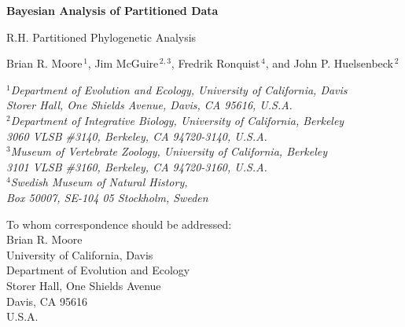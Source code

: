 \documentclass[11pt]{article}
\begin{document}


\begin{titlepage}
\begin{center}

{\Large\bf Bayesian Analysis of Partitioned Data}

\vfill

R.H. Partitioned Phylogenetic Analysis

\vfill

{\sc Brian R. Moore$^{\,1}$, Jim McGuire$^{\,2,3}$, Fredrik Ronquist$^{\,4}$, and John P. Huelsenbeck$^{\,2}$} \\

\bigskip

{\em
$\mbox{}^1$Department of Evolution and Ecology, University of California, Davis\\
\vspace{-0.4\baselineskip}
Storer Hall, One Shields Avenue, Davis, CA 95616, \mbox{U.S.A.} \\

$\mbox{}^2$Department of Integrative Biology, University of California, Berkeley\\
\vspace{-0.4\baselineskip}
3060 VLSB \#3140, Berkeley, CA 94720-3140, \mbox{U.S.A.} \\

$\mbox{}^3$Museum of Vertebrate Zoology, University of California, Berkeley\\
\vspace{-0.4\baselineskip}
3101 VLSB \#3160, Berkeley, CA 94720-3160, \mbox{U.S.A.} \\

$\mbox{}^4$Swedish Museum of Natural History,\\
\vspace{-0.4\baselineskip}
Box 50007, SE-104 05 Stockholm, Sweden \\
}
\end{center}




\vfill

\begin{flushleft}
To whom correspondence should be addressed: \\
Brian R. Moore \\
\vspace{-0.4\baselineskip}
University of California, Davis \\ 
\vspace{-0.4\baselineskip}
Department of Evolution and Ecology \\
\vspace{-0.4\baselineskip}
Storer Hall, One Shields Avenue \\
\vspace{-0.4\baselineskip}
Davis, CA 95616 \\
\vspace{-0.4\baselineskip}
\mbox{U.S.A.}


\end{flushleft}
\end{titlepage}
\end{document}
